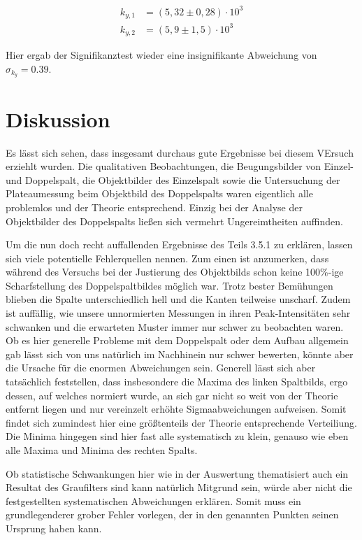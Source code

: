 \documentclass{article}
\begin{document}
\begin{equation}
    \begin{split}
        k_{y,1} &= (5,32 \pm 0,28) \cdot 10^{3} \\
        k_{y,2} &= (5,9 \pm 1,5) \cdot 10^{3}
    \end{split}
\end{equation}

Hier ergab der Signifikanztest wieder eine insignifikante Abweichung von $\sigma_{k_y} = 0.39$.

\newpage
\section{Diskussion}

Es lässt sich sehen, dass insgesamt durchaus gute Ergebnisse bei diesem VErsuch erziehlt wurden. Die qualitativen Beobachtungen, die Beugungsbilder von Einzel- und Doppelspalt, die Objektbilder des Einzelspalt sowie die Untersuchung der Plateaumessung beim Objektbild des Doppelspalts waren eigentlich alle problemlos und der Theorie entsprechend. Einzig bei der Analyse der Objektbilder des Doppelspalts ließen sich vermehrt Ungereimtheiten auffinden. 

Um die nun doch recht auffallenden Ergebnisse des Teils 3.5.1 zu erklären, lassen sich viele potentielle Fehlerquellen nennen. Zum einen ist anzumerken, dass während des Versuchs bei der Justierung des Objektbilds schon keine 100\%-ige Scharfstellung des Doppelspaltbildes möglich war. Trotz bester Bemühungen blieben die Spalte unterschiedlich hell und die Kanten teilweise unscharf. Zudem ist auffällig, wie unsere unnormierten Messungen in ihren Peak-Intensitäten sehr schwanken und die erwarteten Muster immer nur schwer zu beobachten waren. Ob es hier generelle Probleme mit dem Doppelspalt oder dem Aufbau allgemein gab lässt sich von uns natürlich im Nachhinein nur schwer bewerten, könnte aber die Ursache für die enormen Abweichungen sein. Generell lässt sich aber tatsächlich feststellen, dass insbesondere die Maxima des linken Spaltbilds, ergo dessen, auf welches normiert wurde, an sich gar nicht so weit von der Theorie entfernt liegen und nur vereinzelt erhöhte Sigmaabweichungen aufweisen. Somit findet sich zumindest hier eine größtenteils der Theorie entsprechende Verteiliung. Die Minima hingegen sind hier fast alle systematisch zu klein, genauso wie eben alle Maxima und Minima des rechten Spalts. 

Ob statistische Schwankungen hier wie in der Auswertung thematisiert auch ein Resultat des Graufilters sind kann natürlich Mitgrund sein, würde aber nicht die festgestellten systematischen Abweichungen erklären. Somit muss ein grundlegenderer grober Fehler vorlegen, der in den genannten Punkten seinen Ursprung haben kann.
\end{document}
